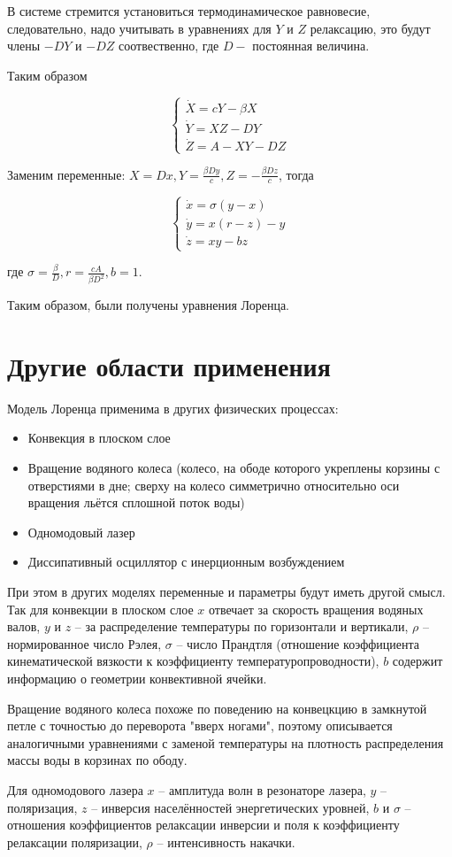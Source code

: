 \documentclass[12pt]{article}
\begin{document}
В системе стремится установиться термодинамическое равновесие, следовательно, надо учитывать в уравнениях для $Y$ и $Z$ релаксацию, это будут члены $-DY$ и $-DZ$ соотвественно, где $D -$ постоянная величина.

Таким образом

$$\begin{cases}
	\dot{X} = cY-\beta X \\
	\dot{Y} = XZ-DY \\
	\dot{Z} = A-XY-DZ
\end{cases}$$

Заменим переменные: $X=Dx, Y=\frac{\beta Dy}{c}, Z=-\frac{\beta Dz}{c}$, тогда

$$\begin{cases}	
	\dot{x} = \sigma (y-x) \\
	\dot{y} = x(r-z)-y \\
	\dot{z} = xy-bz
\end{cases}$$

где $\sigma = \frac{\beta}{D}, r=\frac{cA}{\beta D^2}, b=1$.

Таким образом, были получены уравнения Лоренца.

\section{Другие области применения}

Модель Лоренца применима в других физических процессах:
\begin{itemize}
	\item Конвекция в плоском слое
	\item Вращение водяного колеса (колесо, на ободе которого укреплены корзины с отверстиями в дне; сверху на колесо симметрично относительно оси вращения льётся сплошной поток воды)
	\item Одномодовый лазер
	\item Диссипативный осциллятор с инерционным возбуждением
\end{itemize}

При этом в других моделях переменные и параметры будут иметь другой смысл. Так для конвекции в плоском слое $x$ отвечает за скорость вращения водяных валов, $y$ и $z$ -- за распределение температуры по горизонтали и вертикали, $\rho$ -- нормированное число Рэлея, $\sigma$ -- число Прандтля (отношение коэффициента кинематической вязкости к коэффициенту температуропроводности), $b$ содержит информацию о геометрии конвективной ячейки. 

Вращение водяного колеса похоже по поведению на конвецкцию в замкнутой петле с точностью до переворота "вверх ногами", поэтому описывается аналогичными уравнениями с заменой температуры на плотность распределения массы воды в корзинах по ободу.

Для одномодового лазера $x$ -- амплитуда волн в резонаторе лазера, $y$ -- поляризация, $z$ -- инверсия населённостей энергетических уровней, $b$ и $\sigma$ -- отношения коэффициентов релаксации инверсии и поля к коэффициенту релаксации поляризации, $\rho$ -- интенсивность накачки.
\end{document}

